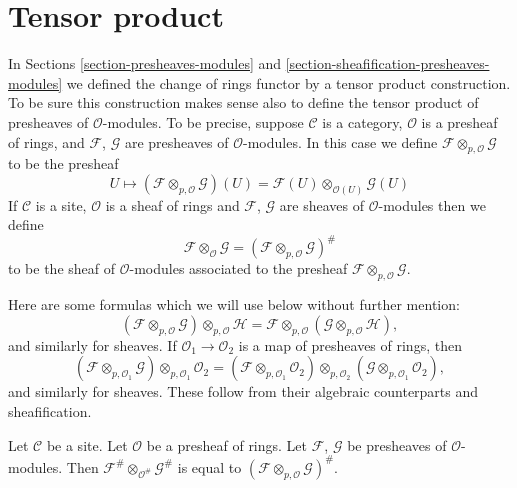 











\section{Tensor product}
\label{section-tensor-product}

\noindent
In Sections \ref{section-presheaves-modules} and
\ref{section-sheafification-presheaves-modules}
we defined the change of rings functor by a tensor
product construction. To be sure this construction makes sense also
to define the tensor product of presheaves of $\mathcal{O}$-modules.
To be precise, suppose $\mathcal{C}$ is a category,
$\mathcal{O}$ is a presheaf of rings, and $\mathcal{F}$, $\mathcal{G}$
are presheaves of $\mathcal{O}$-modules. In this case we define
$\mathcal{F} \otimes_{p, \mathcal{O}} \mathcal{G}$ to be the presheaf
$$
U
\longmapsto
(\mathcal{F} \otimes_{p, \mathcal{O}} \mathcal{G})(U)
=
\mathcal{F}(U) \otimes_{\mathcal{O}(U)} \mathcal{G}(U)
$$
If $\mathcal{C}$ is a site, $\mathcal{O}$ is a sheaf of rings and
$\mathcal{F}$, $\mathcal{G}$ are sheaves of $\mathcal{O}$-modules
then we define
$$
\mathcal{F} \otimes_\mathcal{O} \mathcal{G}
=
(\mathcal{F} \otimes_{p, \mathcal{O}} \mathcal{G})^\#
$$
to be the sheaf of $\mathcal{O}$-modules associated to the presheaf
$\mathcal{F} \otimes_{p, \mathcal{O}} \mathcal{G}$.

\medskip\noindent
Here are some formulas which we will use below without further mention:
$$
(\mathcal{F}
\otimes_{p, \mathcal{O}} \mathcal{G})
\otimes_{p, \mathcal{O}} \mathcal{H}
=
\mathcal{F}
\otimes_{p, \mathcal{O}} (\mathcal{G}
\otimes_{p, \mathcal{O}} \mathcal{H}),
$$
and similarly for sheaves.
If $\mathcal{O}_1 \to \mathcal{O}_2$ is a map of presheaves of rings,
then
$$
(\mathcal{F} \otimes_{p, \mathcal{O}_1} \mathcal{G})
\otimes_{p, \mathcal{O}_1} \mathcal{O}_2 =
(\mathcal{F} \otimes_{p, \mathcal{O}_1} \mathcal{O}_2)
\otimes_{p, \mathcal{O}_2}
(\mathcal{G} \otimes_{p, \mathcal{O}_1} \mathcal{O}_2),
$$
and similarly for sheaves.
These follow from their algebraic counterparts and sheafification.

\begin{lemma}
\label{lemma-sheafification-tensor}
Let $\mathcal{C}$ be a site. Let $\mathcal{O}$ be a presheaf of rings.
Let $\mathcal{F}$, $\mathcal{G}$ be presheaves of $\mathcal{O}$-modules.
Then
$\mathcal{F}^\# \otimes_{\mathcal{O}^\#} \mathcal{G}^\#$
is equal to
$(\mathcal{F} \otimes_{p, \mathcal{O}} \mathcal{G})^\#$.
\end{lemma}

